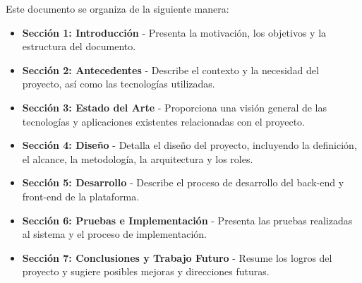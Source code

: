 Este documento se organiza de la siguiente manera:

\begin{itemize}
    \item \textbf{Sección 1: Introducción} - Presenta la motivación, los objetivos y la estructura del documento.
    \item \textbf{Sección 2: Antecedentes} - Describe el contexto y la necesidad del proyecto, así como las tecnologías utilizadas.
    \item \textbf{Sección 3: Estado del Arte} - Proporciona una visión general de las tecnologías y aplicaciones existentes relacionadas con el proyecto.
    \item \textbf{Sección 4: Diseño} - Detalla el diseño del proyecto, incluyendo la definición, el alcance, la metodología, la arquitectura y los roles.
    \item \textbf{Sección 5: Desarrollo} - Describe el proceso de desarrollo del back-end y front-end de la plataforma.
    \item \textbf{Sección 6: Pruebas e Implementación} - Presenta las pruebas realizadas al sistema y el proceso de implementación.
    \item \textbf{Sección 7: Conclusiones y Trabajo Futuro} - Resume los logros del proyecto y sugiere posibles mejoras y direcciones futuras.
\end{itemize}